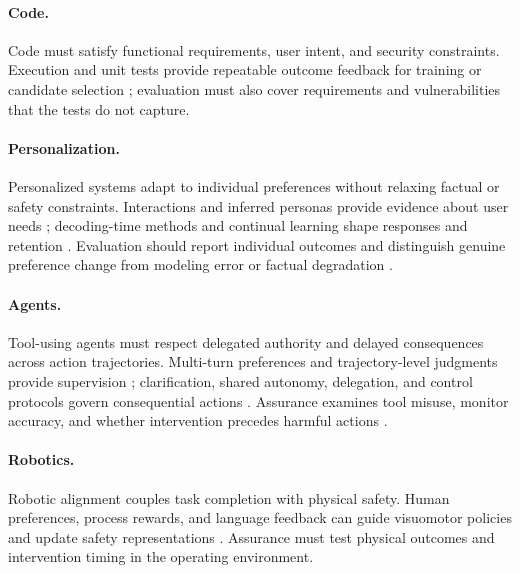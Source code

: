 \documentclass[11pt]{article}
\begin{document}
\paragraph{Code.}
Code must satisfy functional requirements, user intent, and security constraints. Execution and unit tests provide repeatable outcome feedback for training or candidate selection \citep{li2022coderl,hendrycks2021apps,chen2021humaneval}; evaluation must also cover requirements and vulnerabilities that the tests do not capture.

\paragraph{Personalization.}
Personalized systems adapt to individual preferences without relaxing factual or safety constraints. Interactions and inferred personas provide evidence about user needs \citep{wu2025interaction,balepur2025personas}; decoding-time methods and continual learning shape responses and retention \citep{bu2025cope,kim2025drift,zhang2025copr}. Evaluation should report individual outcomes and distinguish genuine preference change from modeling error or factual degradation \citep{sun2026fpps,garbacea2026personalizedbenchmark}.

\paragraph{Agents.}
Tool-using agents must respect delegated authority and delayed consequences across action trajectories. Multi-turn preferences and trajectory-level judgments provide supervision \citep{shani2024multiturn,fan2026agentrrm}; clarification, shared autonomy, delegation, and control protocols govern consequential actions \citep{andukuri2024stargate,xue2025agsa,suri2026clarification,south2025delegation,greenblatt2024control}. Assurance examines tool misuse, monitor accuracy, and whether intervention precedes harmful actions \citep{wang2026agenticeval,ranaldi2026agentic}.

\paragraph{Robotics.}
Robotic alignment couples task completion with physical safety. Human preferences, process rewards, and language feedback can guide visuomotor policies and update safety representations \citep{tian2024rapl,tan2025robodopamine,santos2024robotsafety}. Assurance must test physical outcomes and intervention timing in the operating environment.
\end{document}
